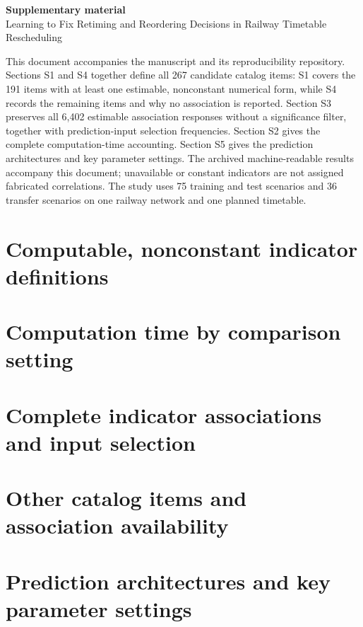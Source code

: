 \documentclass[10pt,a4paper]{article}
\begin{document}
\begin{center}
{\Large\bfseries Supplementary material}\\[8pt]
{\large Learning to Fix Retiming and Reordering Decisions in Railway Timetable Rescheduling}
\end{center}
This document accompanies the manuscript and its reproducibility repository.
Sections S1 and S4 together define all 267 candidate catalog items: S1 covers the 191 items with at least one estimable, nonconstant numerical form, while S4 records the remaining items and why no association is reported.
Section S3 preserves all 6,402 estimable association responses without a significance filter, together with prediction-input selection frequencies.
Section S2 gives the complete computation-time accounting. Section S5 gives the prediction architectures and key parameter settings.
The archived machine-readable results accompany this document; unavailable or constant indicators are not assigned fabricated correlations.
The study uses 75 training and test scenarios and 36 transfer scenarios on one railway network and one planned timetable.
\tableofcontents
\clearpage
\section{Computable, nonconstant indicator definitions}
\label{app:indicators}

\clearpage
\section{Computation time by comparison setting}
\label{app:computation}

\clearpage
\section{Complete indicator associations and input selection}

\clearpage
\section{Other catalog items and association availability}
\label{supp:other-indicators}

\clearpage
\section{Prediction architectures and key parameter settings}
\label{supp:prediction-settings}

\end{document}
